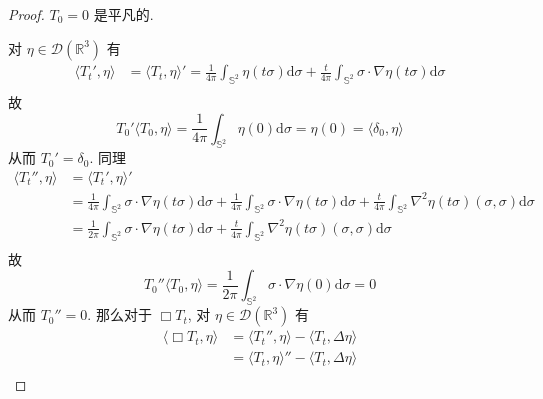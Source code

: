 \documentclass[11pt]{ctexart}[UTF8]
\begin{document}
\begin{proof}
    $T_{0} = 0$ 是平凡的. \par
    对 $\eta \in \mathscr{D}(\mathbb{R}^{3})$ 有
    \begin{equation*}
        \begin{aligned}
            \langle T_{t}', \eta \rangle &= \langle T_{t}, \eta \rangle'=\frac{1}{4\pi}\int_{\mathbb{S}^{2}}  \eta(t\sigma) \mathrm{d}\sigma + \frac{t}{4\pi}\int_{\mathbb{S}^{2}}  \sigma \cdot \nabla \eta(t\sigma) \mathrm{d}\sigma\\
        \end{aligned}
    \end{equation*}
    故
    \begin{equation*}
        T_{0}' \langle T_{0}, \eta \rangle= \frac{1}{4\pi}\int_{\mathbb{S}^{2}}  \eta(0) \mathrm{d}\sigma = \eta(0) = \langle \delta_{0}, \eta \rangle
    \end{equation*}
    从而 $T_{0}' = \delta_{0}$. 同理
    \begin{equation*}
        \begin{aligned}
            \langle T_{t}'', \eta \rangle &= \langle T_{t}', \eta \rangle'\\
            &= \frac{1}{4\pi}\int_{\mathbb{S}^{2}}  \sigma \cdot \nabla \eta(t\sigma) \mathrm{d}\sigma + \frac{1}{4\pi}\int_{\mathbb{S}^{2}}  \sigma \cdot \nabla \eta(t\sigma) \mathrm{d}\sigma + \frac{t}{4\pi}\int_{\mathbb{S}^{2}} \nabla^{2}\eta(t\sigma)(\sigma,\sigma) \mathrm{d}\sigma\\
            &= \frac{1}{2\pi}\int_{\mathbb{S}^{2}}  \sigma \cdot \nabla \eta(t\sigma) \mathrm{d}\sigma + \frac{t}{4\pi}\int_{\mathbb{S}^{2}} \nabla^{2}\eta(t\sigma)(\sigma,\sigma) \mathrm{d}\sigma\\
        \end{aligned}
    \end{equation*}
    故
    \begin{equation*}
        T_{0}'' \langle T_{0}, \eta \rangle = \frac{1}{2\pi}\int_{\mathbb{S}^{2}}  \sigma \cdot \nabla \eta(0) \mathrm{d}\sigma = 0
    \end{equation*}
    从而 $T_{0}'' = 0$. 那么对于 $\Box T_{t}$, 对 $\eta \in \mathscr{D}(\mathbb{R}^{3})$ 有
    \begin{equation*}
        \begin{aligned}
            \langle \Box T_{t}, \eta \rangle &= \langle T_{t}'', \eta \rangle - \langle T_{t}, \Delta \eta \rangle\\
            &= \langle T_{t}, \eta \rangle'' - \langle T_{t}, \Delta \eta \rangle\\

\end{aligned}
\end{equation*}
\end{proof}
\end{document}
